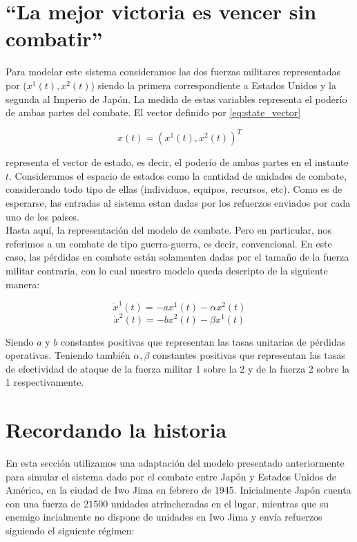 \documentclass{sig-alternate}
\begin{document}
\section{``La mejor victoria es vencer sin combatir''}
\label{sec:allyourbasearebelongtous}
Para modelar este sistema consideramos las dos fuerzas militares representadas por ($x^1(t), x^2(t)$) siendo la primera correspondiente a Estados
Unidos y la segunda al Imperio de Japón. La medida de estas variables representa el poderío de ambas partes del combate. 
El vector definido por \eqref{eq:state_vector}

\begin{equation}
x(t) = ( x^1(t), x^2(t) )^T \label{eq:state_vector}
\end{equation}

representa el vector de estado, es decir, el poderío de ambas partes en el instante $t$. Consideramos el espacio de estados como la cantidad de 
unidades de combate, considerando todo tipo de ellas (individuos, equipos, recursos, etc). Como es de esperarse, las entradas al sistema estan 
dadas por los refuerzos enviados por cada uno de los países.\\
Hasta aquí, la representación del modelo de combate. Pero en particular, nos referimos a un combate de tipo guerra-guerra, es decir, convencional.
En este caso, las pérdidas en combate están solamenten dadas por el tamaño de la fuerza militar contraria, con lo cual nuestro modelo queda descripto de la
siguiente manera:

\begin{equation}
\dot{x}^1(t) = -ax^1(t) - \alpha x^2(t)\end{equation}
\begin{equation}
\dot{x}^2(t) = -bx^2(t) - \beta x^1(t)\end{equation}

Siendo $a$ y $b$ constantes positivas que representan las tasas unitarias de pérdidas operativas. Teniendo también $\alpha, \beta$ 
constantes positivas que representan las tasas de efectividad de ataque de la fuerza militar 1 sobre la 2 y de la fuerza 2 sobre la 1 respectivamente.

\section{Recordando la historia}
\label{sec:remember}
En esta sección utilizamos una adaptación del modelo presentado anteriormente para simular el sistema dado por el combate entre Japón y 
Estados Unidos de América, en la ciudad de Iwo Jima en febrero de 1945. Inicialmente Japón cuenta con una fuerza de 21500 unidades 
atrincheradas en el lugar, mientras que su enemigo incialmente no dispone de unidades en Iwo Jima y envía refuerzos siguiendo el siguiente 
régimen:
\end{document}
